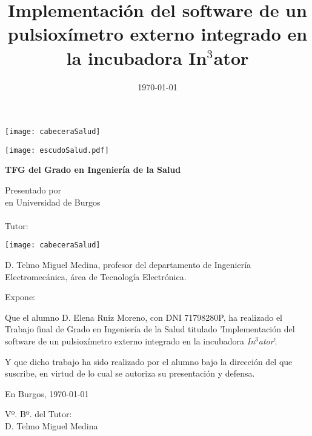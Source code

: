 \documentclass[a4paper,12pt,twoside]{memoir}
\title{Implementación del software de un pulsioxímetro externo integrado en la incubadora In$^3$ator}
\author{\nombre}
\date{\today}
\makeatletter
\def\maketitle{
  \null
  \thispagestyle{empty}
\begin{center}
  \noindent\texttt{[image: cabeceraSalud]}\vspace{1.5cm}%
\end{center}
  
  \begin{center}
    \begin{minipage}[c][1.5cm][c]{.20\textwidth}
        \texttt{[image: escudoSalud.pdf]}
    \end{minipage}
  \end{center}
  
  \begin{center}
    \colorbox{cpardoBox}{%
        \begin{minipage}{.8\textwidth}
          \vspace{.5cm}\Large
          \begin{center}
          \textbf{TFG del Grado en Ingeniería de la Salud}\vspace{.6cm}\\
          \textbf{\LARGE\@title{}}
          \end{center}
          \vspace{.2cm}
        \end{minipage}
    }%
  \end{center}
  
  \begin{center}%
  {%
    \noindent\LARGE
    Presentado por \@author{}\\ 
    en Universidad de Burgos\\
    \vspace{0.5cm}
    \noindent\Large
    \@date{}\\
    \vspace{0.5cm}
    Tutor: \@tutor{} %
  }%
  \end{center}%
  \null
  \cleardoublepage
  }
\newcommand{\nombre}{Elena Ruiz Moreno}
\newcommand{\nombreTutor}{Telmo Miguel Medina}
\newcommand{\nombreTutorb}{Tutor 2}
\newcommand{\dni}{71798280P}
\makeatother
\begin{document}
\maketitle


\newpage\null\thispagestyle{empty}\newpage

\thispagestyle{empty}


\noindent\texttt{[image: cabeceraSalud]}\vspace{1cm}

\noindent D. \nombreTutor, profesor del departamento de Ingeniería Electromecánica, área de Tecnología Electrónica.

\noindent Expone:

\noindent Que el alumno D. \nombre, con DNI \dni, ha realizado el Trabajo final de Grado en Ingeniería de la Salud titulado 'Implementación del software de un pulsioxímetro externo integrado en la incubadora \textit{In$^3$ator}'. 

\noindent Y que dicho trabajo ha sido realizado por el alumno bajo la dirección del que suscribe, en virtud de lo cual se autoriza su presentación y defensa.

\begin{center} %
En Burgos, {\large \today}
\end{center}

\vfill\vfill\vfill


\vfill

Vº. Bº. del Tutor:\\[2cm]
D. Telmo Miguel Medina


\newpage\null\thispagestyle{empty}\newpage
\end{document}
